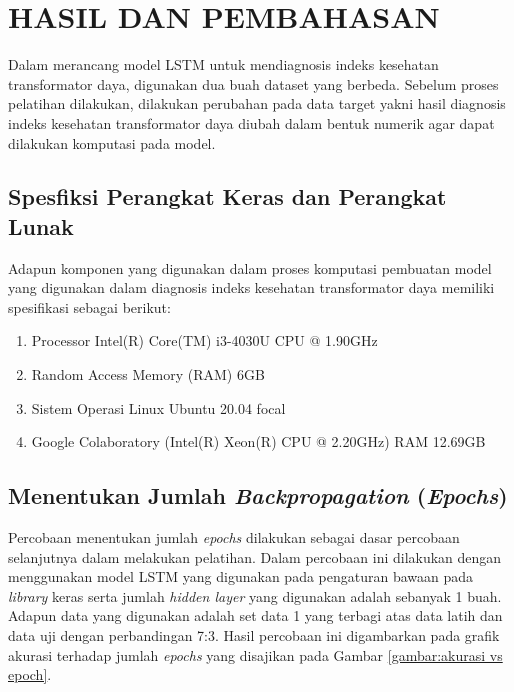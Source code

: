 \chapter{HASIL DAN PEMBAHASAN}
\label{BAB4:hasil}

Dalam merancang model LSTM untuk mendiagnosis indeks kesehatan transformator daya, digunakan dua buah dataset yang berbeda. Sebelum proses pelatihan dilakukan, dilakukan perubahan pada data target yakni hasil diagnosis indeks kesehatan transformator daya diubah dalam bentuk numerik agar dapat dilakukan komputasi pada model. 
\section{Spesfiksi Perangkat Keras dan Perangkat Lunak}
Adapun komponen yang digunakan dalam proses komputasi pembuatan model yang digunakan dalam diagnosis indeks kesehatan transformator daya memiliki spesifikasi sebagai berikut:
\begin{enumerate}
	\setlength{\itemsep}{0pt}%
	\item Processor Intel(R) Core(TM) i3-4030U CPU @ 1.90GHz
	\item Random Access Memory (RAM) 6GB
	\item Sistem Operasi Linux Ubuntu 20.04 focal
	\item Google Colaboratory (Intel(R) Xeon(R) CPU @ 2.20GHz) RAM 12.69GB
\end{enumerate}

\section{Menentukan Jumlah \textit{Backpropagation} (\textit{Epochs})}
Percobaan menentukan jumlah \textit{epochs} dilakukan sebagai dasar percobaan selanjutnya dalam melakukan pelatihan. Dalam percobaan ini dilakukan dengan menggunakan model LSTM yang digunakan pada pengaturan bawaan pada \textit{library} keras serta jumlah \textit{hidden layer} yang digunakan adalah sebanyak 1 buah. Adapun data yang digunakan adalah set data 1 yang terbagi atas data latih dan data uji dengan perbandingan 7:3. Hasil percobaan ini digambarkan pada grafik akurasi terhadap jumlah \textit{epochs} yang disajikan pada Gambar \ref{gambar:akurasi vs epoch}. 

\begin{minipage}{\textwidth}
	\centering
	\label{gambar:akurasi vs epoch}
\end{minipage}

